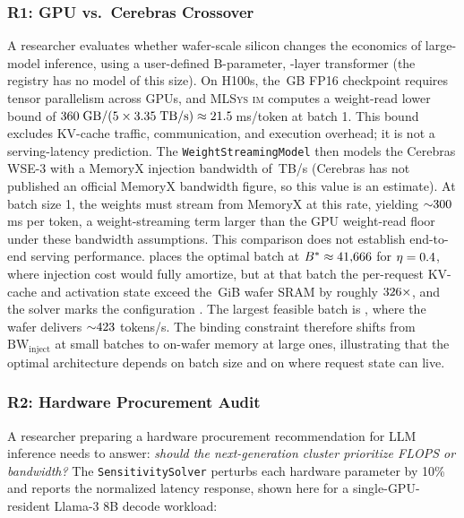 \documentclass[10pt,twocolumn]{article}
\newcommand{\mlsysim}{\mbox{\textsc{MLSys}\,\textperiodcentered\,\textsc{im}}\xspace}
\begin{document}
\subsubsection{R1: GPU vs.\ Cerebras Crossover}
A researcher evaluates whether wafer-scale silicon changes the economics of large-model inference, using a user-defined \CaseROneParamsB{}B-parameter, \CaseROneLayers-layer transformer (the registry has no model of this size). On H100s, the \CaseROneWeightsGB\,GB FP16 checkpoint requires tensor parallelism across \CaseROneGpuTp{} GPUs, and \mlsysim computes a weight-read lower bound of $360\;\text{GB} / (5 \times 3.35\;\text{TB/s}) \approx 21.5$\,ms/token at batch 1. This bound excludes KV-cache traffic, communication, and execution overhead; it is not a serving-latency prediction. The \texttt{WeightStreamingModel} then models the Cerebras WSE-3 with a MemoryX injection bandwidth of \CaseROneInjectionTBs\,TB/s (Cerebras has not published an official MemoryX bandwidth figure, so this value is an estimate). At batch size 1, the weights must stream from MemoryX at this rate, yielding ${\sim}300$\,ms per token, a weight-streaming term larger than the GPU weight-read floor under these bandwidth assumptions. This comparison does not establish end-to-end serving performance.  places the optimal batch at $B^{*} \approx 41{,}666$ for $\eta = 0.4$, where injection cost would fully amortize, but at that batch the per-request KV-cache and activation state exceed the \CaseROneWaferSramGiB\,GiB wafer SRAM by roughly $326{\times}$, and the solver marks the configuration \CaseROneFeasibleAtOptimal. The largest feasible batch is \CaseROneMaxFeasibleBatch, where the wafer delivers ${\sim}423$ tokens/s. The binding constraint therefore shifts from $\text{BW}_{\text{inject}}$ at small batches to on-wafer memory at large ones, illustrating that the optimal architecture depends on batch size and on where request state can live.

\subsubsection{R2: Hardware Procurement Audit}
A researcher preparing a hardware procurement recommendation for LLM inference needs to answer: \emph{should the next-generation cluster prioritize FLOPS or bandwidth?} The \texttt{SensitivitySolver} perturbs each hardware parameter by 10\% and reports the normalized latency response, shown here for a single-GPU-resident Llama-3 8B decode workload:
\end{document}
